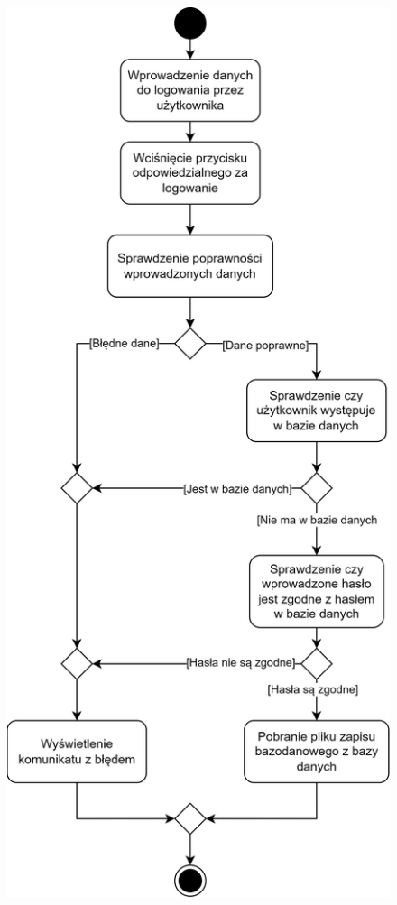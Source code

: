 \documentclass[12pt, a4paper]{article} %
\begin{document}
\begin{figure}
	\centering
	\begin{minipage}{.5\textwidth}
	  \centering
	  \includegraphics[width=.8\textwidth]{images/diagramy_czynnosci/plan-diagram_czynnosci_logowanie.png}
	  \label{rys:diagram_czynnosci_logowanie}
	\end{minipage}%

\end{figure}
\end{document}
